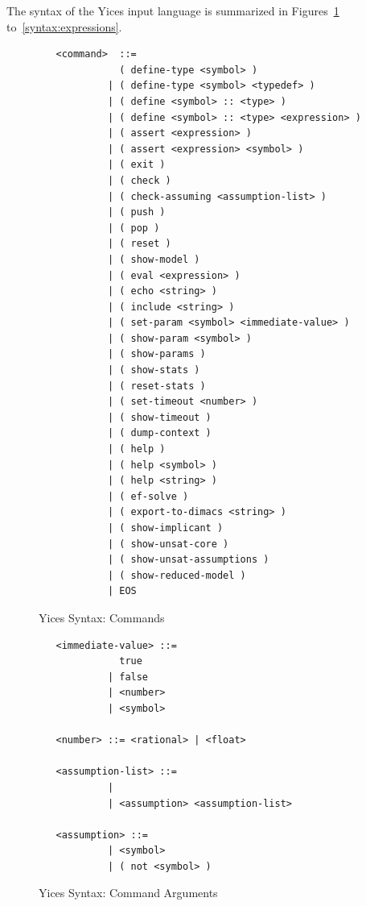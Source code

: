 \documentclass[11pt,twoside,fleqn,openright,titlepage]{cslreport}
\begin{document}
The   syntax  of   the   Yices  input   language   is  summarized   in
Figures~\ref{syntax:commands} to~\ref{syntax:expressions}.


\begin{figure}
\begin{small}
\begin{verbatim}
   <command>  ::=
              ( define-type <symbol> )
            | ( define-type <symbol> <typedef> )
            | ( define <symbol> :: <type> )
            | ( define <symbol> :: <type> <expression> )
            | ( assert <expression> )
            | ( assert <expression> <symbol> )
            | ( exit )
            | ( check )
            | ( check-assuming <assumption-list> )
            | ( push )
            | ( pop )
            | ( reset )
            | ( show-model )
            | ( eval <expression> )
            | ( echo <string> )
            | ( include <string> )
            | ( set-param <symbol> <immediate-value> )
            | ( show-param <symbol> )
            | ( show-params )
            | ( show-stats )
            | ( reset-stats )
            | ( set-timeout <number> )
            | ( show-timeout )
            | ( dump-context )
            | ( help )
            | ( help <symbol> )
            | ( help <string> )
            | ( ef-solve )
            | ( export-to-dimacs <string> )
            | ( show-implicant )
            | ( show-unsat-core )
            | ( show-unsat-assumptions )
            | ( show-reduced-model )
            | EOS

\end{verbatim}
\end{small}
\caption{Yices Syntax: Commands}
\label{syntax:commands}
\end{figure}

\begin{figure}
\begin{small}
\begin{verbatim}
   <immediate-value> ::=
              true
            | false
            | <number>
            | <symbol>

   <number> ::= <rational> | <float>

   <assumption-list> ::=
            |
            | <assumption> <assumption-list>

   <assumption> ::=
            | <symbol>
            | ( not <symbol> )

\end{verbatim}
\end{small}
\caption{Yices Syntax: Command Arguments}
\end{figure}
\end{document}
